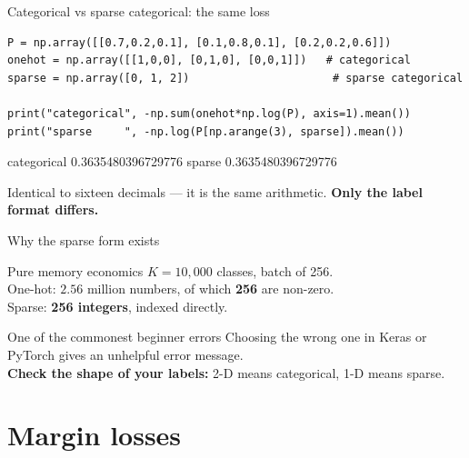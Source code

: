\documentclass[aspectratio=169]{beamer}
\begin{document}
\begin{frame}[fragile]{Categorical vs sparse categorical: the same loss}
\begin{lstlisting}
P = np.array([[0.7,0.2,0.1], [0.1,0.8,0.1], [0.2,0.2,0.6]])
onehot = np.array([[1,0,0], [0,1,0], [0,0,1]])   # categorical
sparse = np.array([0, 1, 2])                      # sparse categorical

print("categorical", -np.sum(onehot*np.log(P), axis=1).mean())
print("sparse     ", -np.log(P[np.arange(3), sparse]).mean())
\end{lstlisting}
\begin{outblk}
categorical 0.3635480396729776
sparse      0.3635480396729776
\end{outblk}
\vspace{0.2em}
\begin{center}\small
  Identical to sixteen decimals --- it is the same arithmetic.
  \textbf{Only the label format differs.}
\end{center}
\end{frame}

\begin{frame}{Why the sparse form exists}
  \begin{exampleblock}{Pure memory economics}
    $K = 10{,}000$ classes, batch of 256.\\[0.3em]
    One-hot: $2.56$ million numbers, of which \textbf{256} are non-zero.\\
    Sparse: \textbf{256 integers}, indexed directly.
  \end{exampleblock}
  \vspace{0.6em}
  \begin{alertblock}{One of the commonest beginner errors}
    Choosing the wrong one in Keras or PyTorch gives an unhelpful error
    message.\\[0.3em]
    \textbf{Check the shape of your labels:} 2-D means categorical, 1-D means
    sparse.
  \end{alertblock}
\end{frame}

\section{Margin losses}
\label{sec:margin}
\end{document}
